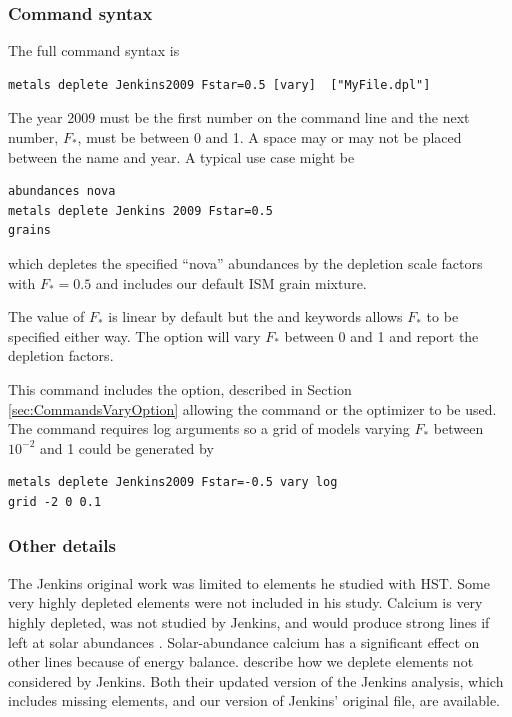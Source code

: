 \subsubsection{Command syntax}

The full command syntax is
\begin{verbatim}
metals deplete Jenkins2009 Fstar=0.5 [vary]  ["MyFile.dpl"]
\end{verbatim}
The year 2009 must be the first number on the command line and the next number, $F_*$,
must be between 0 and 1.
A space may or may not be placed between the name and year.
A typical use case might be
\begin{verbatim}
abundances nova
metals deplete Jenkins 2009 Fstar=0.5
grains
\end{verbatim}
which depletes the specified ``nova'' abundances by the \citet{2009ApJ...700.1299J}
depletion scale factors with $F_* = 0.5$ and includes our default ISM grain mixture.

The value of $F_*$ is linear by default but
the  and  keywords allows
$F_*$ to be specified either way.
 The  option will vary $F_*$ between 0 and 1 and report the depletion factors.

This command includes the  option, described in Section \ref{sec:CommandsVaryOption}
allowing the  command
 or the  optimizer to be used.
 The   command requires log arguments so a grid of models
 varying $F_*$ between $10^{-2}$ and 1 could be generated by
 \begin{verbatim}
metals deplete Jenkins2009 Fstar=-0.5 vary log
grid -2 0 0.1 
\end{verbatim}
 

\subsubsection{Other details}

 The Jenkins original work was limited to elements he studied with HST.  
 Some very highly depleted elements were not included in his study.
 Calcium is very highly depleted, was not studied by Jenkins, and would 
 produce strong lines if left at solar abundances
 \citep{KingdonFerlandFeibelman1995} .  Solar-abundance calcium has a significant
effect on other lines because of energy balance.
\citet{Gunasekera2022, Gunasekera2023} describe how we deplete elements not considered by Jenkins.
Both their updated version of the Jenkins analysis, which includes  missing elements, and our
version of Jenkins' original file, are available. 

